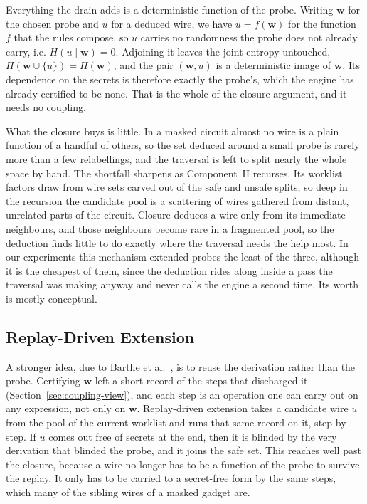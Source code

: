   Everything the drain adds is a deterministic function of the probe. Writing
  $\mathbf{w}$ for the chosen probe and $u$ for a deduced wire, we have $u =
  f(\mathbf{w})$ for the function $f$ that the rules compose, so $u$ carries no
  randomness the probe does not already carry, i.e. $H(u \mid \mathbf{w}) = 0$.
  Adjoining it leaves the joint entropy untouched, $H(\mathbf{w} \cup \{u\}) =
  H(\mathbf{w})$, and the pair $(\mathbf{w}, u)$ is a deterministic image of
  $\mathbf{w}$. Its dependence on the secrets is therefore exactly the probe's,
  which the engine has already certified to be none. That is the whole of the
  closure argument, and it needs no coupling.

  What the closure buys is little. In a masked circuit almost no wire is a plain
  function of a handful of others, so the set deduced around a small probe is
  rarely more than a few relabellings, and the traversal is left to split nearly
  the whole space by hand. The shortfall sharpens as Component~II recurses. Its
  worklist factors draw from wire sets carved out of the safe and unsafe splits, so
  deep in the recursion the candidate pool is a scattering of wires gathered from
  distant, unrelated parts of the circuit. Closure deduces a wire only from its
  immediate neighbours, and those neighbours become rare in a fragmented pool,
  so the deduction finds little to do exactly where the traversal needs
  the help most. In our experiments this mechanism extended probes the least of the
  three, although it is the cheapest of them, since the deduction rides along inside
  a pass the traversal was making anyway and never calls the engine a second time.
  Its worth is mostly conceptual.

  \subsection{Replay-Driven Extension}
  \label{sec:replay}

  A stronger idea, due to Barthe et al.\ \parencite{10.1007/978-3-030-29959-0_15},
  is to reuse the derivation rather than the probe. Certifying $\mathbf{w}$ left a
  short record of the steps that discharged it (Section~\ref{sec:coupling-view}),
  and each step is an operation one can carry out on any expression, not only on
  $\mathbf{w}$. Replay-driven extension takes a candidate wire $u$ from the pool of
  the current worklist and runs that same record on it, step by step. If $u$ comes
  out free of secrets at the end, then it is blinded by the very derivation that
  blinded the probe, and it joins the safe set. This reaches well past the closure,
  because a wire no longer has to be a function of the probe to survive the replay.
  It only has to be carried to a secret-free form by the same steps, which many of
  the sibling wires of a masked gadget are.

